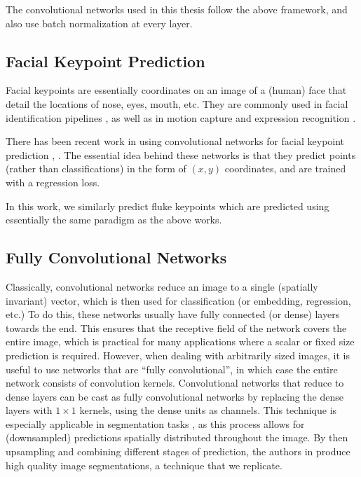 The convolutional networks used in this thesis follow the above framework, and also use batch normalization \cite{ioffe2015batch} at every layer.

\subsection{Facial Keypoint Prediction}

Facial keypoints are essentially coordinates on an image of a (human) face that detail the locations of nose, eyes, mouth, etc.
They are commonly used in facial identification pipelines \cite{taigman2014deepface}, as well as in motion capture \cite{akagi2013facial} and expression recognition \cite{berretti20112d}.

There has been recent work in using convolutional networks for facial keypoint prediction \cite{sun2013deep}, \cite{nouri2014using}. 
The essential idea behind these networks is that they predict points (rather than classifications) in the form of $(x, y)$ coordinates, and are trained with a regression loss.

In this work, we similarly predict fluke keypoints which are predicted using essentially the same paradigm as the above works.

\subsection{Fully Convolutional Networks}

Classically, convolutional networks reduce an image to a single (spatially invariant) vector, which is then used for classification (or embedding, regression, etc.)
To do this, these networks usually have fully connected (or dense) layers towards the end.
This ensures that the receptive field of the network covers the entire image, which is practical for many applications where a scalar or fixed size prediction is required. 
However, when dealing with arbitrarily sized images, it is useful to use networks that are ``fully convolutional'', in which case the entire network consists of convolution kernels. 
Convolutional networks that reduce to dense layers can be cast as fully convolutional networks by replacing the dense layers with $1\times1$ kernels, using the dense units as channels.
This technique is especially applicable in segmentation tasks \cite{ning2005toward}, as this process allows for (downsampled) predictions spatially distributed throughout the image. %
By then upsampling and combining different stages of prediction, the authors in \cite{long2015fully} produce high quality image segmentations, a technique that we replicate.

